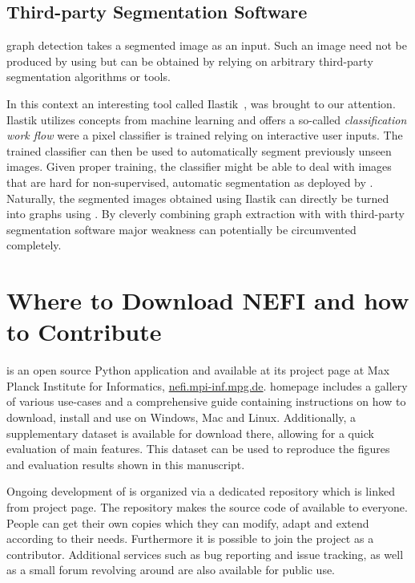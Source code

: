 	\subsection{Third-party Segmentation Software}

		\NEFIs graph detection takes a segmented image as an input. Such an image need not be produced by using \NEFI but can be obtained by relying on arbitrary third-party segmentation algorithms or tools. 

		In this context an interesting tool called Ilastik~\cite{sommer2011ilastik}, was brought to our attention. Ilastik utilizes concepts from machine learning and offers a so-called \emph{classification work flow} were a pixel classifier is trained relying on interactive user inputs. The trained classifier can then be used to automatically segment previously unseen images. Given proper training, the classifier might be able to deal with images that are hard for non-supervised, automatic segmentation as deployed by \NEFI. Naturally, the segmented images obtained using Ilastik can directly be turned into graphs using \NEFI. By cleverly combining \NEFIs graph extraction with with third-party segmentation software \NEFIs major weakness can potentially be circumvented completely.

\section{Where to Download NEFI and how to Contribute}

	\NEFI is an open source Python application and available at its project page at Max Planck Institute for Informatics, \href{http://nefi.mpi-inf.mpg.de}{nefi.mpi-inf.mpg.de}. \NEFIs homepage includes a gallery of various use-cases and a comprehensive guide containing instructions on how to download, install and use \NEFI on Windows, Mac and Linux. Additionally, a supplementary dataset is available for download there, allowing for a quick evaluation of \NEFIs main features. This dataset can be used to reproduce the figures and evaluation results shown in this manuscript. 

	Ongoing development of \NEFI is organized via a dedicated repository which is linked from \NEFIs project page. The repository makes the source code of \NEFI available to everyone. People can get their own copies which they can modify, adapt and extend according to their needs. Furthermore it is possible to join the project as a contributor. Additional services such as bug reporting and issue tracking, as well as a small forum revolving around \NEFI are also available for public use.

